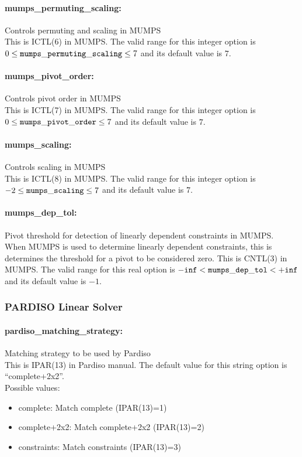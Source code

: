 \paragraph{mumps\_permuting\_scaling:} Controls permuting and scaling in MUMPS $\;$ \\
 This is ICTL(6) in MUMPS. The valid range for this integer option is
$0 \le {\tt mumps\_permuting\_scaling } \le 7$
and its default value is $7$.


\paragraph{mumps\_pivot\_order:} Controls pivot order in MUMPS $\;$ \\
 This is ICTL(7) in MUMPS. The valid range for this integer option is
$0 \le {\tt mumps\_pivot\_order } \le 7$
and its default value is $7$.


\paragraph{mumps\_scaling:} Controls scaling in MUMPS $\;$ \\
 This is ICTL(8) in MUMPS. The valid range for this integer option is
$-2 \le {\tt mumps\_scaling } \le 7$
and its default value is $7$.


\paragraph{mumps\_dep\_tol:} Pivot threshold for detection of linearly dependent constraints in MUMPS. $\;$ \\
 When MUMPS is used to determine linearly
dependent constraints, this is determines the
threshold for a pivot to be considered zero. 
This is CNTL(3) in MUMPS. The valid range for this real option is 
${\tt -inf} <  {\tt mumps\_dep\_tol } <  {\tt +inf}$
and its default value is $-1$.

\subsubsection{PARDISO Linear Solver}

\paragraph{pardiso\_matching\_strategy:} Matching strategy to be used by Pardiso $\;$ \\
This is IPAR(13) in Pardiso manual.
The default value for this string option is ``complete+2x2''.
\\
Possible values:
\begin{itemize}
   \item complete: Match complete (IPAR(13)=1)
   \item complete+2x2: Match complete+2x2 (IPAR(13)=2)
   \item constraints: Match constraints (IPAR(13)=3)
\end{itemize}

